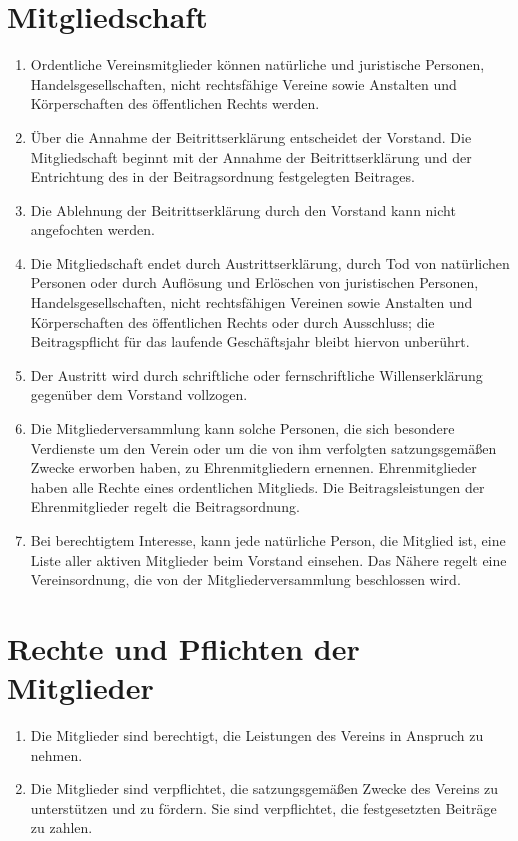 \documentclass[a4paper]{article}
\begin{document}
\section{Mitgliedschaft}
\begin{enumerate}
    \item Ordentliche Vereinsmitglieder können natürliche und juristische Personen, Handelsgesellschaften, nicht rechtsfähige Vereine sowie Anstalten und Körperschaften des öffentlichen Rechts werden.
    \item Über die Annahme der Beitrittserklärung entscheidet der Vorstand. Die Mitgliedschaft beginnt mit der Annahme der Beitrittserklärung und der Entrichtung des in der Beitragsordnung festgelegten Beitrages.
    \item Die Ablehnung der Beitrittserklärung durch den Vorstand kann nicht angefochten werden.
    \item Die Mitgliedschaft endet durch Austrittserklärung, durch Tod von natürlichen Personen oder durch Auflösung und Erlöschen von juristischen Personen, Handelsgesellschaften, nicht rechtsfähigen Vereinen sowie Anstalten und Körperschaften des öffentlichen Rechts oder durch Ausschluss; die Beitragspflicht für das laufende Geschäftsjahr bleibt hiervon unberührt.
    \item Der Austritt wird durch schriftliche oder fernschriftliche Willenserklärung gegenüber dem Vorstand vollzogen.
    \item Die Mitgliederversammlung kann solche Personen, die sich besondere Verdienste um den Verein oder um die von ihm verfolgten satzungsgemäßen Zwecke erworben haben, zu Ehrenmitgliedern ernennen. Ehrenmitglieder haben alle Rechte eines ordentlichen Mitglieds. Die Beitragsleistungen der Ehrenmitglieder regelt die Beitragsordnung.
    \item Bei berechtigtem Interesse, kann jede natürliche Person, die Mitglied ist, eine Liste aller aktiven Mitglieder beim Vorstand einsehen. Das Nähere regelt eine Vereinsordnung, die von der Mitgliederversammlung beschlossen wird.
\end{enumerate}

\section{Rechte und Pflichten der Mitglieder}
\begin{enumerate}
    \item Die Mitglieder sind berechtigt, die Leistungen des Vereins in Anspruch zu nehmen.
    \item Die Mitglieder sind verpflichtet, die satzungsgemäßen Zwecke des Vereins zu unterstützen und zu fördern. Sie sind verpflichtet, die festgesetzten Beiträge zu zahlen.
\end{enumerate}
\end{document}
